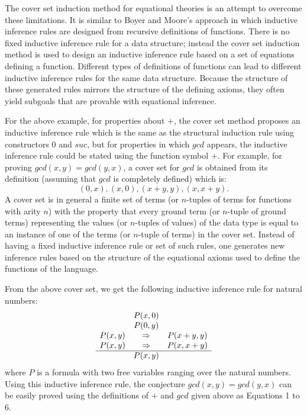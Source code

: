 The cover set induction method for equational theories is an
attempt to overcome these limitations.  It is similar to Boyer and
Moore's approach in which inductive inference rules are designed from
recursive definitions of functions.  There is no fixed inductive
inference rule for a data structure; instead the cover set induction
method is used to design an inductive inference rule based on a set
of equations defining a function.  Different types of definitions of
functions can lead to different inductive inference rules for the
same data structure.  Because the structure of these generated rules
mirrors the structure of the defining axioms, they often yield
subgoals that are provable with equational inference.  

For the above example, for properties about $+$, the cover set method
proposes an inductive inference rule which is the same as the
structural induction rule using constructors $0$ and $suc$, but
for properties in which $gcd$ appears, the inductive inference
rule could be stated using the function symbol $+$.  For example, for
proving $gcd(x, y) = gcd(y, x)$, a cover set for
$gcd$ is obtained from its definition (assuming that
$gcd$ is completely defined) which is:
 \[(0, x), (x, 0), (x + y, y), (x, x + y) .\]
A cover set is in general a finite set of terms (or $n$-tuples of terms
for functions with arity $n$) with the property that every ground term
(or $n$-tuple of ground terms) representing the values (or $n$-tuples of
values) of the data type is equal to an instance of one of the
terms (or $n$-tuple of terms) in the cover set.  Instead of
having a fixed inductive inference rule or set of such rules, one
generates new inference rules based on the structure of the
equational axioms used to define the functions of the language.

 From the above cover set, we get the following inductive inference rule for
natural numbers:
 \[\begin{array}{ccc}
& P(x, 0) &\\
   & P(0, y) &\\
   P(x, y) & \Rightarrow & P(x + y, y)\\
   P(x, y) & \Rightarrow & P(x, x + y)\\
   \hline
   & P(x, y) &
 \end{array}\]
where $P$ is a formula with two free variables ranging over the
natural numbers. Using this inductive inference rule, the conjecture
${gcd}(x, y) = {gcd}(y, x)$ can be easily proved using the
definitions of $+$ and ${gcd}$ given above as Equations 1 to 6.

